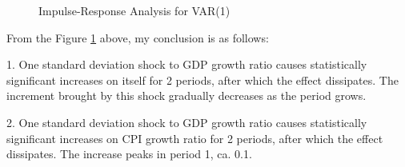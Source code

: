 \documentclass{report}
\begin{document}
\begin{figure}[H]
\centering  %

\caption{Impulse-Response Analysis for VAR(1)} 
\label{Fig.irf}
\end{figure}

From the Figure \ref{Fig.irf} above, my conclusion is as follows:


1. One standard deviation shock to GDP growth ratio causes statistically significant increases on itself for 2 periods, after which the effect dissipates. The increment brought by this shock gradually decreases as the period grows.

2. One standard deviation shock to GDP growth ratio causes statistically significant increases on CPI growth ratio for 2 periods, after which the effect dissipates.  The increase peaks in period 1, ca. 0.1.
\end{document}
